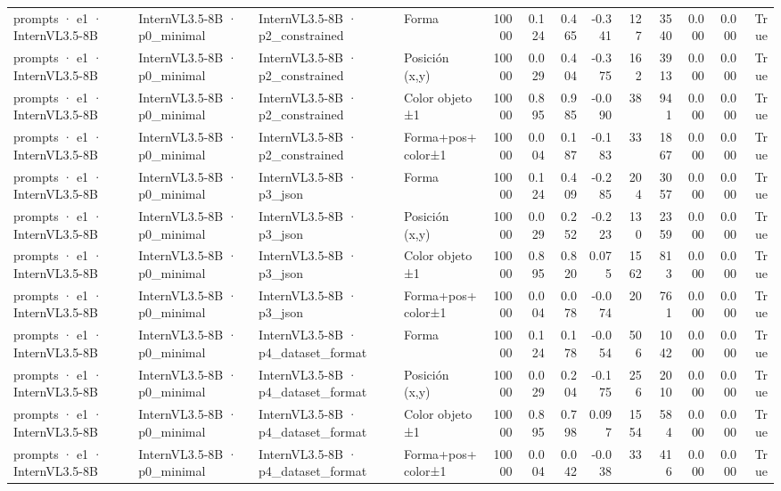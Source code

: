 \begin{tabular}{llllrrrrrrrrr}
prompts · e1 · InternVL3.5-8B & InternVL3.5-8B · p0\_minimal & InternVL3.5-8B · p2\_constrained & Forma & 10000 & 0.124 & 0.465 & -0.341 & 127 & 3540 & 0.000 & 0.000 & True \\
prompts · e1 · InternVL3.5-8B & InternVL3.5-8B · p0\_minimal & InternVL3.5-8B · p2\_constrained & Posición (x,y) & 10000 & 0.029 & 0.404 & -0.375 & 162 & 3913 & 0.000 & 0.000 & True \\
prompts · e1 · InternVL3.5-8B & InternVL3.5-8B · p0\_minimal & InternVL3.5-8B · p2\_constrained & Color objeto ±1 & 10000 & 0.895 & 0.985 & -0.090 & 38 & 941 & 0.000 & 0.000 & True \\
prompts · e1 · InternVL3.5-8B & InternVL3.5-8B · p0\_minimal & InternVL3.5-8B · p2\_constrained & Forma+pos+color±1 & 10000 & 0.004 & 0.187 & -0.183 & 33 & 1867 & 0.000 & 0.000 & True \\
prompts · e1 · InternVL3.5-8B & InternVL3.5-8B · p0\_minimal & InternVL3.5-8B · p3\_json & Forma & 10000 & 0.124 & 0.409 & -0.285 & 204 & 3057 & 0.000 & 0.000 & True \\
prompts · e1 · InternVL3.5-8B & InternVL3.5-8B · p0\_minimal & InternVL3.5-8B · p3\_json & Posición (x,y) & 10000 & 0.029 & 0.252 & -0.223 & 130 & 2359 & 0.000 & 0.000 & True \\
prompts · e1 · InternVL3.5-8B & InternVL3.5-8B · p0\_minimal & InternVL3.5-8B · p3\_json & Color objeto ±1 & 10000 & 0.895 & 0.820 & 0.075 & 1562 & 813 & 0.000 & 0.000 & True \\
prompts · e1 · InternVL3.5-8B & InternVL3.5-8B · p0\_minimal & InternVL3.5-8B · p3\_json & Forma+pos+color±1 & 10000 & 0.004 & 0.078 & -0.074 & 20 & 761 & 0.000 & 0.000 & True \\
prompts · e1 · InternVL3.5-8B & InternVL3.5-8B · p0\_minimal & InternVL3.5-8B · p4\_dataset\_format & Forma & 10000 & 0.124 & 0.178 & -0.054 & 506 & 1042 & 0.000 & 0.000 & True \\
prompts · e1 · InternVL3.5-8B & InternVL3.5-8B · p0\_minimal & InternVL3.5-8B · p4\_dataset\_format & Posición (x,y) & 10000 & 0.029 & 0.204 & -0.175 & 256 & 2010 & 0.000 & 0.000 & True \\
prompts · e1 · InternVL3.5-8B & InternVL3.5-8B · p0\_minimal & InternVL3.5-8B · p4\_dataset\_format & Color objeto ±1 & 10000 & 0.895 & 0.798 & 0.097 & 1554 & 584 & 0.000 & 0.000 & True \\
prompts · e1 · InternVL3.5-8B & InternVL3.5-8B · p0\_minimal & InternVL3.5-8B · p4\_dataset\_format & Forma+pos+color±1 & 10000 & 0.004 & 0.042 & -0.038 & 33 & 416 & 0.000 & 0.000 & True \\

\end{tabular}
